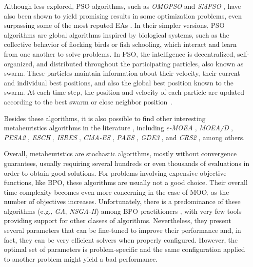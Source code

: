 	Although less explored, \ac{PSO} algorithms, such as \textit{OMOPSO} and \textit{SMPSO} \cite{Sierra2005OMOPSO,SMPSO}, have also been shown to yield promising results in some optimization problems, even surpassing some of the most reputed \acp{EA} \cite{Durillo2011SMPSO}. In their simpler versions, \ac{PSO} algorithms are global algorithms inspired by biological systems, such as the collective behavior of flocking birds or fish schooling, which interact and learn from one another to solve problems. In \ac{PSO}, the intelligence is decentralized, self-organized, and distributed throughout the participating particles, also known as swarm. These particles maintain information about their velocity, their current and individual best positions, and also the global best position known to the swarm. At each time step, the position and velocity of each particle are updated according to the best swarm or close neighbor position~\cite{Brownlee2011}.
	
	Besides these algorithms, it is also possible to find other interesting metaheuristics algorithms in the literature \cite{Zavala2014, Wortmann2017GABESTCHOICE}, including $\epsilon$\textit{-MOEA} \cite{Deb2003EpsMOEA}, \textit{MOEA/D} \cite{Zhang2007MOEAD}, \textit{PESA2} \cite{Corne2001}, \textit{ESCH} \cite{Santos2010}, \textit{ISRES} \cite{Runarsson2000}, \textit{CMA-ES} \cite{Hansen2006}, \textit{PAES} \cite{Knowles1999}, \textit{GDE3} \cite{GDE3}, and \textit{CRS2} \cite{Kaelo2006CRS2}, among others.
	
	Overall, metaheuristics are stochastic algorithms, mostly without convergence guarantees, usually requiring several hundreds or even thousands of evaluations in order to obtain good solutions. For problems involving expensive objective functions, like \ac{BPO}, these algorithms are usually not a good choice. Their overall time complexity becomes even more concerning in the case of \ac{MOO}, as the number of objectives increases. Unfortunately, there is a predominance of these algorithms (e.g., \textit{\ac{GA}}, \textit{\ac{NSGA-II}}) among \ac{BPO} practitioners \cite{Wortmann2017GABESTCHOICE}, with very few tools providing support for other classes of algorithms. Nevertheless, they present several parameters that can be fine-tuned to improve their performance and, in fact, they can be very efficient solvers when properly configured. However, the optimal set of parameters is problem-specific and the same configuration applied to another problem might yield a bad performance.
	
